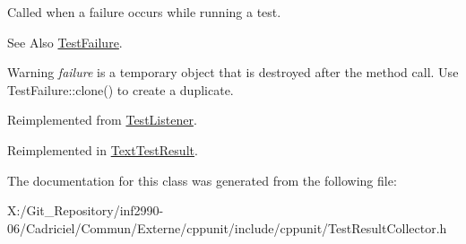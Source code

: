 Called when a failure occurs while running a test. 

\begin{DoxySeeAlso}{See Also}
\hyperlink{class_test_failure}{Test\-Failure}. 
\end{DoxySeeAlso}
\begin{DoxyWarning}{Warning}
{\itshape failure} is a temporary object that is destroyed after the method call. Use Test\-Failure\-::clone() to create a duplicate. 
\end{DoxyWarning}


Reimplemented from \hyperlink{class_test_listener_a103216a5814c907f7b752b969477e765}{Test\-Listener}.



Reimplemented in \hyperlink{class_text_test_result_a05d3b0e8e51b3430092166bbc3d17708}{Text\-Test\-Result}.



The documentation for this class was generated from the following file\-:\begin{DoxyCompactItemize}
\item 
X\-:/\-Git\-\_\-\-Repository/inf2990-\/06/\-Cadriciel/\-Commun/\-Externe/cppunit/include/cppunit/Test\-Result\-Collector.\-h\end{DoxyCompactItemize}
